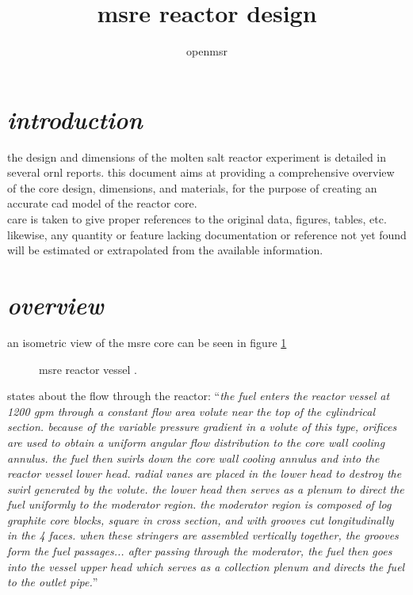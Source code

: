 \documentclass[ms,a4paper]{memoir}
\title{msre reactor design}
\author{openmsr}
\date{}
\newcommand*{\mrsarchive}{../../msr-archive}%
\begin{document}
\maketitle

\vspace{-4cm}
\renewcommand{\contentsname}{contents}
\tableofcontents*


\section{\emph{introduction}}
the design and dimensions of the molten salt reactor experiment is detailed in several ornl reports. this document aims at providing a comprehensive overview of the core design, dimensions, and materials, for the purpose of creating an accurate cad model of the reactor core. \\

care is taken to give proper references to the original data, figures, tables, etc. likewise, any quantity or feature lacking documentation or reference not yet found will be estimated or extrapolated from the available information.



\section{\emph{overview}}
an isometric view of the msre core can be seen in figure \ref{3229-fig1}
\begin{figure}[H]
  \centering
  \caption{msre reactor vessel \parencite[figure 1]{ornl-tm-3229}.}
  \label{3229-fig1}
\end{figure}

\textcite[page 1]{ornl-tm-3229} states about the flow through the reactor:
\enquote{\textit{the fuel enters the reactor vessel at 1200 gpm through a constant flow area volute near the top of the cylindrical section. because of the variable pressure gradient in a volute of this type, orifices are used to obtain a uniform angular flow distribution to the core wall cooling annulus. the fuel then swirls down the core wall cooling annulus and into the reactor vessel lower head. radial vanes are placed in the lower head to destroy the swirl generated by the volute. the lower head then serves as a plenum to direct the fuel uniformly to the moderator region. the moderator region is composed of log graphite core blocks, square in cross section, and with grooves cut longitudinally in the 4 faces. when these stringers are assembled vertically together, the grooves form the fuel passages... after passing through the moderator, the fuel then goes into the vessel upper head which serves as a collection plenum and directs the fuel to the outlet pipe.}}
\end{document}
